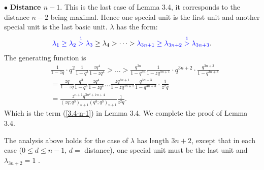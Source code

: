 \documentclass[draft]{amsart}
\numberwithin{equation}{section}
\theoremstyle{plain}
\theoremstyle{remark}
\begin{document}
$\bullet$ {\bf Distance $n-1.$} 
This is the last case of Lemma 3.4, it corresponds to the distance $n-2$ being maximal. Hence one special unit is the first unit and another special unit is the last basic unit. $\lambda$ has the form:
$$
{\color{blue}\lambda_{1}  \geq \lambda_{2} \overset{1}{>} \lambda_{3}} \geq  \lambda_{4} >\dots > {\color{blue} \lambda_{3n+1} \geq \lambda_{3n+2}\overset{1}{>}  \lambda_{3n+3}}.
$$
The generating function is
\begin{align*}
 &\frac{1}{1-zq}\cdot q^{2}\frac{1}{1-q^{3}}
 \frac{zq^{4}}{1-zq^{4}}>\dots >\frac{q^{3n}}{1-q^{3n}}\frac{1}{1-zq^{3n+1}}\cdot q^{3n+2}\cdot\frac{q^{3n+3}}{1-q^{3n+3}}\\\nonumber
&= \frac{zq}{1-zq}\frac{q^{3}}{1-q^{3}} \frac{zq^{4}}{1-zq^{4}}\dots\frac{zq^{3n+1}}{1-zq^{3n+1}} \frac{q^{3n+3}}{1-q^{3n+3}}\cdot\frac{1}{z^{2}q^{}}\\\nonumber
&=\frac{z^{n+1}q^{3n^{2}+7n+4}}{(zq;q^{3})_{n+1}(q^{3};q^{3})_{n+1}}\frac{1}{z^{2}q}.\nonumber
\end{align*}
Which is the term (\ref{3.4-n-1}) in Lemma 3.4. We complete the proof of  Lemma 3.4.




The analysis above holds for the case of $\lambda$ has length $3n+2$, except that in each case ($0\leq d \leq n-1$, $d=$ distance), one special unit must be the last unit and $\lambda_{3n+2}=1$ .
\end{document}
